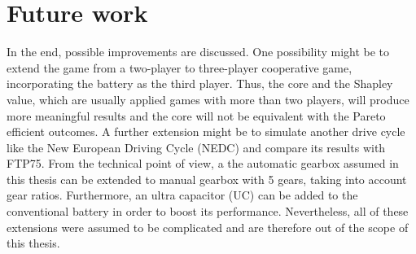 \section{Future work}
In the end, possible improvements are discussed. One possibility might be to extend the game from a two-player to three-player cooperative game, incorporating the battery as the third player. Thus, the core and the Shapley value, which are usually applied games with more than two players, will produce more meaningful results and the core will not be equivalent with the Pareto efficient outcomes. A further extension might be to simulate another drive cycle like the New European Driving Cycle (NEDC) and compare its results with FTP75. From the technical point of view, a the automatic gearbox  assumed in this thesis can be extended to manual gearbox with 5 gears, taking into account gear ratios. Furthermore, an ultra capacitor (UC) can be added to the conventional battery in order to boost its performance. Nevertheless, all of these extensions were assumed to be complicated and are therefore out of the scope of this thesis.
